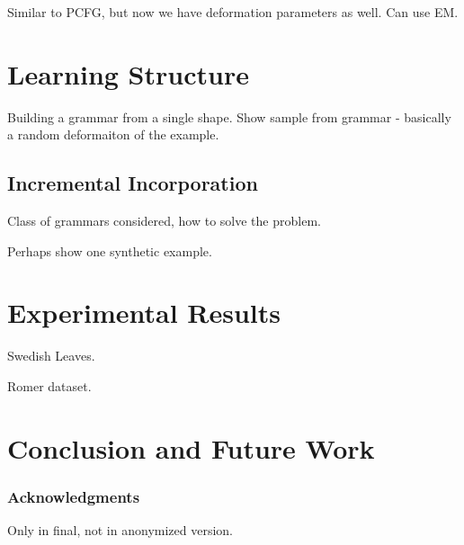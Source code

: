 \documentclass[10pt]{article}
\begin{document}
Similar to PCFG, but now we have deformation parameters as well.  Can use EM.

\section{Learning Structure}

Building a grammar from a single shape.  Show sample from grammar -
basically a random deformaiton of the example.

\subsection{Incremental Incorporation}

Class of grammars considered, how to solve the problem.

Perhaps show one synthetic example.

\section{Experimental Results}

Swedish Leaves.

Romer dataset.

\section{Conclusion and Future Work}

\subsubsection*{Acknowledgments}

Only in final, not in anonymized version.


{\def\section*#1{\subsubsection*{#1}}
\tiny{

}
}
\end{document}
